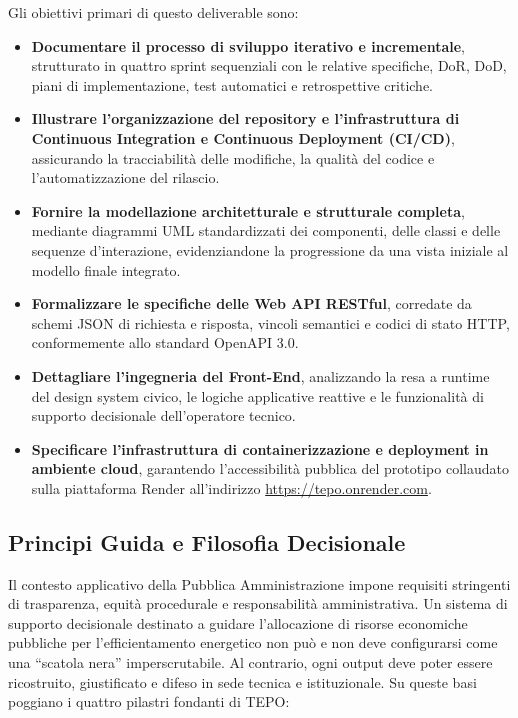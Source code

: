 Gli obiettivi primari di questo deliverable sono:
\begin{itemize}[leftmargin=1.5em, itemsep=0.3em]
    \item \textbf{Documentare il processo di sviluppo iterativo e incrementale}, strutturato in quattro sprint sequenziali con le relative specifiche, DoR, DoD, piani di implementazione, test automatici e retrospettive critiche.
    \item \textbf{Illustrare l'organizzazione del repository e l'infrastruttura di Continuous Integration e Continuous Deployment (CI/CD)}, assicurando la tracciabilità delle modifiche, la qualità del codice e l'automatizzazione del rilascio.
    \item \textbf{Fornire la modellazione architetturale e strutturale completa}, mediante diagrammi UML standardizzati dei componenti, delle classi e delle sequenze d'interazione, evidenziandone la progressione da una vista iniziale al modello finale integrato.
    \item \textbf{Formalizzare le specifiche delle Web API RESTful}, corredate da schemi JSON di richiesta e risposta, vincoli semantici e codici di stato HTTP, conformemente allo standard OpenAPI 3.0.
    \item \textbf{Dettagliare l'ingegneria del Front-End}, analizzando la resa a runtime del design system civico, le logiche applicative reattive e le funzionalità di supporto decisionale dell'operatore tecnico.
    \item \textbf{Specificare l'infrastruttura di containerizzazione e deployment in ambiente cloud}, garantendo l'accessibilità pubblica del prototipo collaudato sulla piattaforma Render all'indirizzo \url{https://tepo.onrender.com}.
\end{itemize}

\subsection{Principi Guida e Filosofia Decisionale}
Il contesto applicativo della Pubblica Amministrazione impone requisiti stringenti di trasparenza, equità procedurale e responsabilità amministrativa. Un sistema di supporto decisionale destinato a guidare l'allocazione di risorse economiche pubbliche per l'efficientamento energetico non può e non deve configurarsi come una ``scatola nera'' imperscrutabile. Al contrario, ogni output deve poter essere ricostruito, giustificato e difeso in sede tecnica e istituzionale.
Su queste basi poggiano i quattro pilastri fondanti di TEPO:

